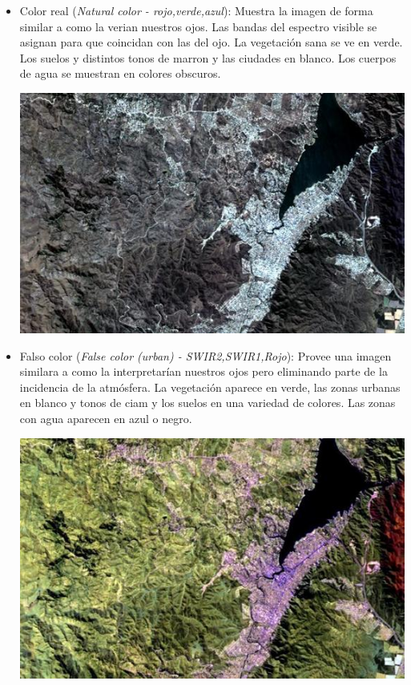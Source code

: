 \documentclass[a4paper,12pt]{book}
\begin{document}
\begin{itemize}
    \item Color real (\emph{Natural color - rojo,verde,azul}): Muestra la imagen de forma similar a como la verian nuestros ojos. Las bandas del espectro visible se asignan para que coincidan con  las del ojo. La vegetación sana se ve en verde. Los suelos y distintos tonos de marron y las ciudades en blanco. Los cuerpos de agua se muestran en colores obscuros.
    \begin{center}\includegraphics[scale=0.4]{4-3-2.jpeg}\end{center}
    \item Falso color (\emph{False color (urban) - SWIR2,SWIR1,Rojo}): Provee una imagen similara a como la interpretarían nuestros ojos pero eliminando parte de la incidencia de la atmósfera. La vegetación aparece en verde, las zonas urbanas en blanco y tonos de ciam y los suelos en una variedad de colores. Las zonas con agua aparecen en azul o negro.
    \begin{center}\includegraphics[scale=0.4]{12-11-4.jpeg}\end{center}

\end{itemize}
\end{document}
